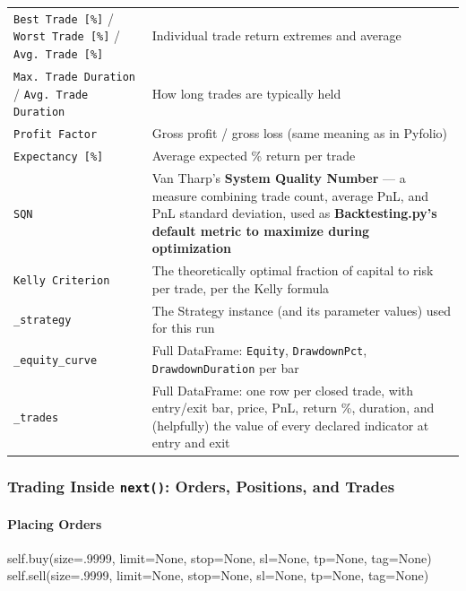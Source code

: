 \documentclass[12pt,openany]{book}
\theoremstyle{definition}
\theoremstyle{remark}
\begin{document}
\begin{longtable}{@{}L{0.46\textwidth}L{0.46\textwidth}@{}}
\texttt{Best Trade [\%]} / \texttt{Worst Trade [\%]} / \texttt{Avg. Trade [\%]} & Individual trade return extremes and average \\
\texttt{Max. Trade Duration} / \texttt{Avg. Trade Duration} & How long trades are typically held \\
\texttt{Profit Factor} & Gross profit / gross loss (same meaning as in Pyfolio) \\
\texttt{Expectancy [\%]} & Average expected \% return per trade \\
\texttt{SQN} & Van Tharp's \textbf{System Quality Number} — a measure combining trade count, average PnL, and PnL standard deviation, used as \textbf{Backtesting.py's default metric to maximize during optimization} \\
\texttt{Kelly Criterion} & The theoretically optimal fraction of capital to risk per trade, per the Kelly formula \\
\texttt{\_strategy} & The Strategy instance (and its parameter values) used for this run \\
\texttt{\_equity\_curve} & Full DataFrame: \texttt{Equity}, \texttt{DrawdownPct}, \texttt{DrawdownDuration} per bar \\
\texttt{\_trades} & Full DataFrame: one row per closed trade, with entry/exit bar, price, PnL, return \%, duration, and (helpfully) the value of every declared indicator at entry and exit \\
\bottomrule
\end{longtable}
\subsubsection{Trading Inside \texttt{next()}: Orders, Positions, and Trades}

\paragraph{Placing Orders}

\begin{python}
self.buy(size=.9999, limit=None, stop=None, sl=None, tp=None, tag=None)
self.sell(size=.9999, limit=None, stop=None, sl=None, tp=None, tag=None)
\end{python}
\end{document}

